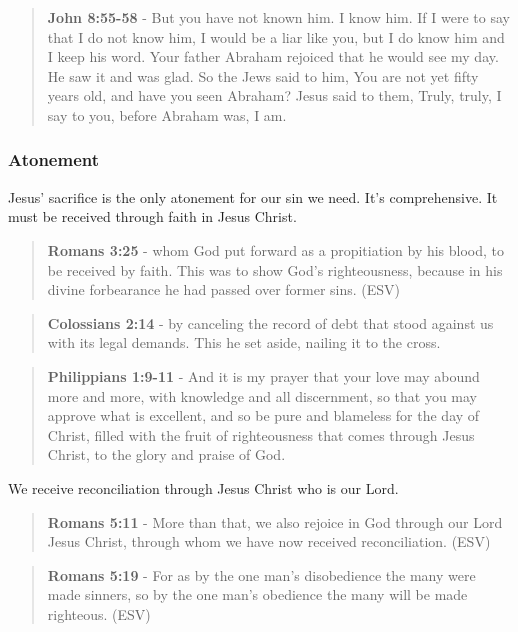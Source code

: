 \documentclass[11pt]{article}
\begin{document}
\begin{quote}
\textbf{John 8:55-58} - But you have not known him. I know him. If I were to say that I do not know him, I would be a liar like you, but I do know him and I keep his word. Your father Abraham rejoiced that he would see my day. He saw it and was glad. So the Jews said to him, You are not yet fifty years old, and have you seen Abraham? Jesus said to them, Truly, truly, I say to you, before Abraham was, I am.
\end{quote}

\subsubsection{Atonement}
\label{sec:org1f5568b}
Jesus' sacrifice is the only atonement for our sin we need. It's comprehensive.
It must be received through faith in Jesus Christ.

\begin{quote}
\textbf{Romans 3:25} -  whom God put forward as a propitiation by his blood, to be received by faith.  This was to show God's righteousness, because in his divine forbearance he had passed over former sins.  (ESV)
\end{quote}

\begin{quote}
\textbf{Colossians 2:14} - by canceling the record of debt that stood against us with its legal demands. This he set aside, nailing it to the cross.
\end{quote}

\begin{quote}
\textbf{Philippians 1:9-11} - And it is my prayer that your love may abound more and more, with knowledge and all discernment, so that you may approve what is excellent, and so be pure and blameless for the day of Christ, filled with the fruit of righteousness that comes through Jesus Christ, to the glory and praise of God.
\end{quote}

We receive reconciliation through Jesus Christ who is our Lord.

\begin{quote}
\textbf{Romans 5:11} - More than that, we also rejoice in God through our Lord Jesus Christ, through whom we have now received reconciliation. (ESV)
\end{quote}

\begin{quote}
\textbf{Romans 5:19} - For as by the one man's disobedience the many were made sinners, so by the one man's obedience the many will be made righteous. (ESV)
\end{quote}
\end{document}
